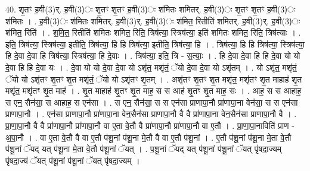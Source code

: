 \documentclass[17pt]{extarticle}
\begin{document}
40. शृ॒तꣳ ह॒वी(3)र्. ह॒वी(3)ः शृ॒तꣳ शृ॒तꣳ ह॒वी(3)ः श॑मितः शमितर्. ह॒वी(3)ः शृ॒तꣳ शृ॒तꣳ ह॒वी(3)ः श॑मितः । . ह॒वी(3)ः श॑मितः शमितर्. ह॒वी(3)र्. ह॒वी(3)ः श॑मित॒ रितीति॑ शमितर्. ह॒वी(3)र्. ह॒वी(3)ः श॑मित॒ रिति॑ । . श॒मि॒त॒ रितीति॑ शमितः शमित॒ रिति॒ त्रिष॑त्या॒ स्त्रिष॑त्या॒ इति॑ शमितः शमित॒ रिति॒ त्रिष॑त्याः । . इति॒ त्रिष॑त्या॒ स्त्रिष॑त्या॒ इतीति॒ त्रिष॑त्या॒ हि हि त्रिष॑त्या॒ इतीति॒ त्रिष॑त्या॒ हि । . त्रिष॑त्या॒ हि हि त्रिष॑त्या॒ स्त्रिष॑त्या॒ हि दे॒वा दे॒वा हि त्रिष॑त्या॒ स्त्रिष॑त्या॒ हि दे॒वाः । . त्रिष॑त्या॒ इति॒ त्रि - स॒त्याः॒ । . हि दे॒वा दे॒वा हि हि दे॒वा यो यो दे॒वा हि हि दे॒वा यः । . दे॒वा यो यो दे॒वा दे॒वा यो ऽशृ॑त॒ मशृ॑तं॒ ॅयो दे॒वा दे॒वा यो ऽशृ॑तम् । . यो ऽशृ॑त॒ मशृ॑तं॒ ॅयो यो ऽशृ॑तꣳ शृ॒तꣳ शृ॒त मशृ॑तं॒ ॅयो यो ऽशृ॑तꣳ शृ॒तम् । . अशृ॑तꣳ शृ॒तꣳ शृ॒त मशृ॑त॒ मशृ॑तꣳ शृ॒त माहाह॑ शृ॒त मशृ॑त॒ मशृ॑तꣳ शृ॒त माह॑ । . शृ॒त माहाह॑ शृ॒तꣳ शृ॒त माह॒ स स आह॑ शृ॒तꣳ शृ॒त माह॒ सः । . आह॒ स स आहाह॒ स एन॒ सैन॑सा॒ स आहाह॒ स एन॑सा । . स एन॒ सैन॑सा॒ स स एन॑सा प्राणापा॒नौ प्रा॑णापा॒ना वेन॑सा॒ स स एन॑सा प्राणापा॒नौ । . एन॑सा प्राणापा॒नौ प्रा॑णापा॒ना वेन॒सैन॑सा प्राणापा॒नौ वै वै प्रा॑णापा॒ना वेन॒सैन॑सा प्राणापा॒नौ वै । . प्रा॒णा॒पा॒नौ वै वै प्रा॑णापा॒नौ प्रा॑णापा॒नौ वा ए॒ता वे॒तौ वै प्रा॑णापा॒नौ प्रा॑णापा॒नौ वा ए॒तौ । . प्रा॒णा॒पा॒नाविति॑ प्राण - अ॒पा॒नौ । . वा ए॒ता वे॒तौ वै वा ए॒तौ प॑शू॒नां प॑शू॒ना मे॒तौ वै वा ए॒तौ प॑शू॒नां । . ए॒तौ प॑शू॒नां प॑शू॒ना मे॒ता वे॒तौ प॑शू॒नां ॅयद् यत् प॑शू॒ना मे॒ता वे॒तौ प॑शू॒नां ॅयत् । . प॒शू॒नां ॅयद् यत् प॑शू॒नां प॑शू॒नां ॅयत् पृ॑षदा॒ज्यम् पृ॑षदा॒ज्यं ॅयत् प॑शू॒नां प॑शू॒नां ॅयत् पृ॑षदा॒ज्यम् । \newline
\pagebreak
{}
\end{document}
